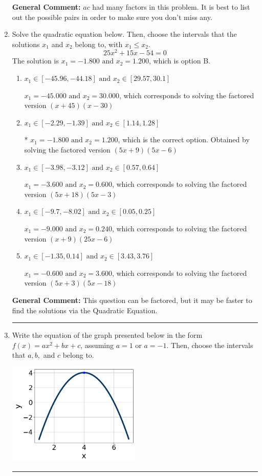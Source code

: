 \documentclass{extbook}[14pt]
\newcommand{\litem}[1]{\item #1

\rule{\textwidth}{0.4pt}}
\begin{document}
\begin{enumerate}
{\textbf{General Comment:} $ac$ had many factors in this problem. It is best to list out the possible pairs in order to make sure you don't miss any.
}
\litem{
Solve the quadratic equation below. Then, choose the intervals that the solutions $x_1$ and $x_2$ belong to, with $x_1 \leq x_2$.
\[ 25x^{2} +15 x -54 = 0 \]The solution is \( x_1 = -1.800 \text{ and } x_2 = 1.200 \), which is option B.\begin{enumerate}[label=\Alph*.]
\item \( x_1 \in [-45.96, -44.18] \text{ and } x_2 \in [29.57, 30.1] \)

$x_1 = -45.000 \text{ and } x_2 = 30.000$, which corresponds to solving the factored version $(x + 45)(x -30)$
\item \( x_1 \in [-2.29, -1.39] \text{ and } x_2 \in [1.14, 1.28] \)

* $x_1 = -1.800 \text{ and } x_2 = 1.200$, which is the correct option. Obtained by solving the factored version $(5x + 9)(5x -6)$
\item \( x_1 \in [-3.98, -3.12] \text{ and } x_2 \in [0.57, 0.64] \)

$x_1 = -3.600 \text{ and } x_2 = 0.600$, which corresponds to solving the factored version $(5x + 18)(5x -3)$
\item \( x_1 \in [-9.7, -8.02] \text{ and } x_2 \in [0.05, 0.25] \)

$x_1 = -9.000 \text{ and } x_2 = 0.240$, which corresponds to solving the factored version $(x + 9)(25x -6)$
\item \( x_1 \in [-1.35, 0.14] \text{ and } x_2 \in [3.43, 3.76] \)

$x_1 = -0.600 \text{ and } x_2 = 3.600$, which corresponds to solving the factored version $(5x + 3)(5x -18)$
\end{enumerate}

\textbf{General Comment:} This question can be factored, but it may be faster to find the solutions via the Quadratic Equation.
}
\litem{
Write the equation of the graph presented below in the form $f(x)=ax^2+bx+c$, assuming  $a=1$ or $a=-1$. Then, choose the intervals that $a, b,$ and $c$ belong to.

\begin{center}
    \includegraphics[width=0.5\textwidth]{../Figures/quadraticGraphToEquationCopyA.png}
\end{center}


}
\end{enumerate}
\end{document}
